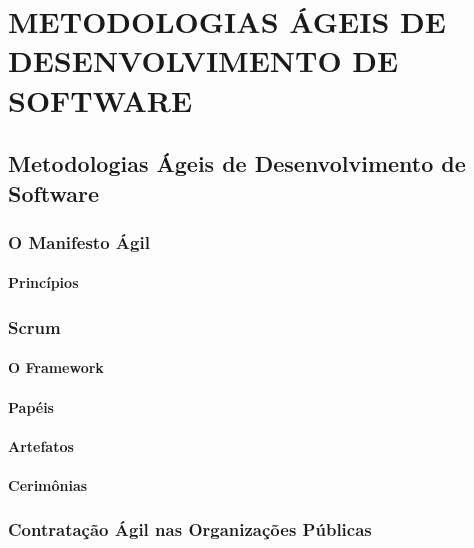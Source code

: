 \part{METODOLOGIAS ÁGEIS DE DESENVOLVIMENTO DE SOFTWARE}

\chapter[Metodologias Ágeis de Desenvolvimento de Software]{Metodologias Ágeis de Desenvolvimento de Software}

\section[O Manifesto Ágil]{O Manifesto Ágil}

\subsection[Princípios]{Princípios}

\section[Scrum]{Scrum}

\subsection[O Framework]{O Framework}

\subsection[Papéis]{Papéis}

\subsection[Artefatos]{Artefatos}

\subsection[Cerimônias]{Cerimônias}

\section[Contratação Ágil nas Organizações Públicas]{Contratação Ágil nas Organizações Públicas}
